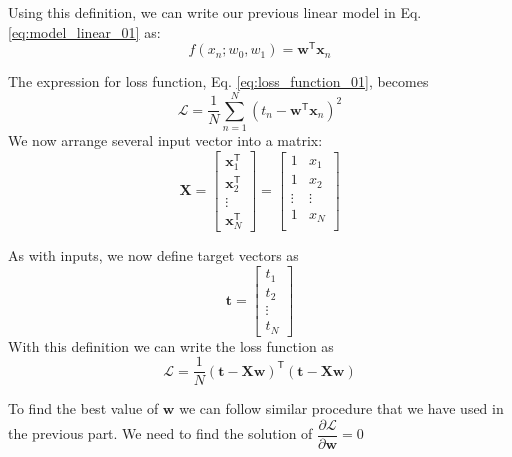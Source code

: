 \documentclass[a4paper,11pt]{article} %
\begin{document}
Using this definition, we can write our previous linear model in Eq.
\eqref{eq:model_linear_01} as:
\begin{equation}
f(x_n; w_0, w_1) = \mathbf{w}^{\mathsf{T}} \mathbf{x}_{n}
\label{eq:model_linear_02}
\end{equation}

The expression for loss function, Eq. \eqref{eq:loss_function_01}, becomes
\begin{equation}
\mathcal{L} = \frac{1}{N} \sum_{n=1}^{N} \left( t_{n} - \mathbf{w}^{\mathsf{T}}
\mathbf{x}_{n} \right)^2
\label{eq:loss_function_02}
\end{equation}
%
We now arrange several input vector into a matrix:
%
\begin{equation*}
\mathbf{X} = \begin{bmatrix}
\mathbf{x}^{\mathsf{T}}_{1} \\
\mathbf{x}^{\mathsf{T}}_{2} \\
\vdots \\
\mathbf{x}^{\mathsf{T}}_{N}
\end{bmatrix} =
\begin{bmatrix}
1 & x_{1} \\
1 & x_{2} \\
\vdots & \vdots \\
1 & x_{N} \\
\end{bmatrix}
\end{equation*}

As with inputs, we now define target vectors as
\begin{equation}
\mathbf{t} = \begin{bmatrix}
t_1 \\
t_2 \\
\vdots \\
t_N
\end{bmatrix}
\end{equation}
%
With this definition we can write the loss function as
\begin{equation}
\mathcal{L} = \frac{1}{N} \left( \mathbf{t} - \mathbf{Xw} \right)^{\mathsf{T}}
\left( \mathbf{t} - \mathbf{Xw} \right)
\end{equation}

To find the best value of $\mathbf{w}$ we can follow similar procedure that we have used
in the previous part. We need to find the solution of
$\dfrac{\partial \mathcal{L}}{\partial \mathbf{w}} = 0$
\end{document}
